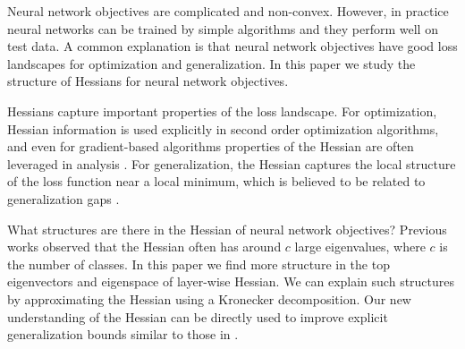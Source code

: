 \label{sec:intro}

Neural network objectives are complicated and non-convex. However, in practice neural networks can be trained by simple algorithms and they perform well on test data. A common explanation is that neural network objectives have good loss landscapes for optimization and generalization. In this paper we study the structure of Hessians for neural network objectives.

Hessians capture important properties of the loss landscape. For optimization, Hessian information is used explicitly in second order optimization algorithms, and even for gradient-based algorithms properties of the Hessian are often leveraged in analysis \citep{sra2012optimization}. For generalization, the Hessian captures the local structure of the loss function near a local minimum, which is believed to be related to generalization gaps \citep{keskar2016large}. %

What structures are there in the Hessian of neural network objectives?
Previous works \citep{sagun2017empirical, papyan2018full} observed that the Hessian often has around $c$ large eigenvalues, where $c$ is the number of classes. In this paper we find more structure in the top eigenvectors and eigenspace of layer-wise Hessian. We can explain such structures by approximating the Hessian using a Kronecker decomposition. Our new understanding of the Hessian can be directly used to improve explicit generalization bounds similar to those in \citet{dziugaite2017computing}.


